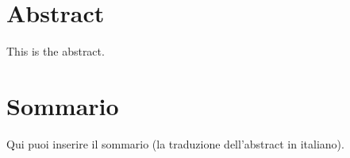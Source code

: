 \chapter*{Abstract}
This is the abstract. \blindtext[2]

\chapter*{Sommario}
Qui puoi inserire il sommario (la traduzione dell'abstract in italiano).
\blindtext[2]
